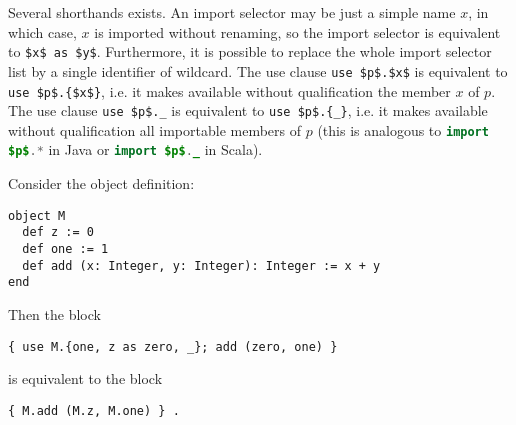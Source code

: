 Several shorthands exists. An import selector may be just a simple name $x$, in which case, $x$ is imported without renaming, so the import selector is equivalent to \lstinline!$x$ as $y$!. Furthermore, it is possible to replace the whole import selector list by a single identifier of wildcard. The use clause \lstinline!use $p$.$x$! is equivalent to \lstinline!use $p$.{$x$}!, i.e. it makes available without qualification the member $x$ of $p$. The use clause \lstinline!use $p$._! is equivalent to \lstinline!use $p$.{_}!, i.e. it makes available without qualification all importable members of $p$ (this is analogous to \lstinline[language=Java]!import $p$.*! in Java or \lstinline[language=Java]!import $p$._! in Scala). 

\example Consider the object definition:
\begin{lstlisting}
object M
  def z := 0
  def one := 1
  def add (x: Integer, y: Integer): Integer := x + y
end
\end{lstlisting}
Then the block
\begin{lstlisting}
{ use M.{one, z as zero, _}; add (zero, one) }
\end{lstlisting}
is equivalent to the block
\begin{lstlisting}
{ M.add (M.z, M.one) } .
\end{lstlisting}



